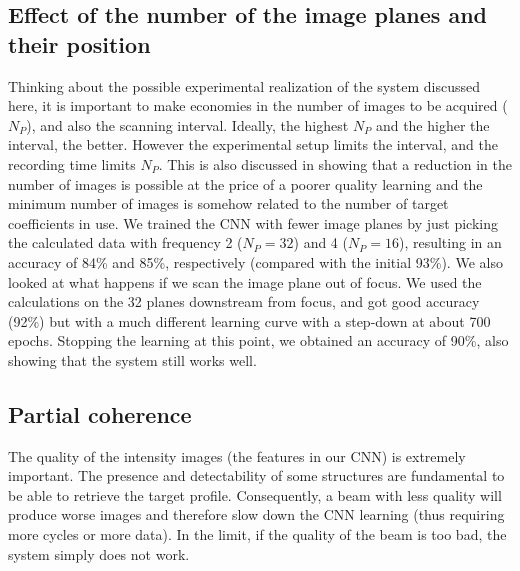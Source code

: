 \documentclass{iucr}
\newcommand{\inred}[1]{{\color{black}#1}}
\begin{document}
\subsection{Effect of the number of the image planes and their position}
Thinking about the possible experimental realization of the system discussed here, it is important to make economies in the number of images to be acquired ($N_P$), and also the scanning interval. Ideally, the highest $N_P$ and the higher the interval, the better. However the experimental setup limits the interval, and the recording time limits $N_P$. This is also discussed in \cite{Saha2020} showing that a reduction in the number of images is possible at the price of a \inred{poorer quality} learning and the minimum number of images is somehow related to the number of target coefficients in use. We trained the CNN with fewer image planes by just picking the calculated data with frequency 2 ($N_P=32$) and 4 ($N_P=16$), resulting in an accuracy of 84\% and 85\%, respectively (compared with the initial 93\%). 
We also looked at what happens if we scan the image plane out of focus. We used the calculations on the 32 planes downstream from focus, and got good accuracy (92\%) but with a much different learning curve with a step-down at about 700 epochs. Stopping the learning at this point, we obtained an accuracy of 90\%, also showing that the system still works well. 

\subsection{Partial coherence}
The quality of the intensity images (the features in our CNN) is extremely important. The presence and detectability of some structures are fundamental to be able to retrieve the target profile. Consequently, a beam with less quality will produce worse images and therefore slow down the CNN learning (thus requiring more cycles or more data). In the limit, if the quality of the beam is too bad, the system simply does not work.  
\end{document}
